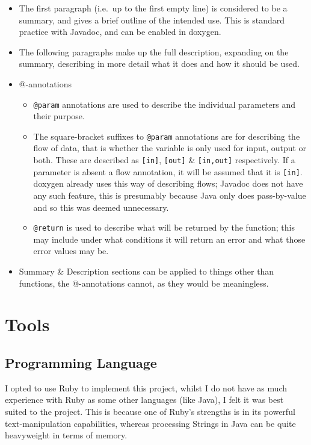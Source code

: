 \begin{itemize}
  \item The first paragraph (i.e.~up to the first empty line) is considered to
    be a summary, and gives a brief outline of the intended use. This is
    standard practice with Javadoc, and can be enabled in doxygen.
  \item The following paragraphs make up the full description, expanding on the
    summary, describing in more detail what it does and how it should be used.
  \item @-annotations
    \begin{itemize}
      \item \lstinline|@param| annotations are used to describe the individual
        parameters and their purpose.
      \item The square-bracket suffixes to \lstinline|@param| annotations are
        for describing the flow of data, that is whether the variable is only
        used for input, output or both. These are described as \lstinline|[in]|,
        \lstinline|[out]| \& \lstinline|[in,out]| respectively. If a parameter
        is absent a flow annotation, it will be assumed that it is
        \lstinline|[in]|.
        doxygen already uses this way of describing flows; Javadoc does not have
        any such feature, this is presumably because Java only does
        pass-by-value and so this was deemed unnecessary.
      \item \lstinline|@return| is used to describe what will be returned by the
        function; this may include under what conditions it will return an error
        and what those error values may be.
    \end{itemize}
    \item Summary \& Description sections can be applied to things other than
      functions, the @-annotations cannot, as they would be meaningless.
\end{itemize}

\section{Tools}
  \subsection{Programming Language}
    I opted to use Ruby to implement this project, whilst I do not have as much
    experience with Ruby as some other languages (like Java), I felt it was best
    suited to the project. This is because one of Ruby's strengths is in its
    powerful text-manipulation capabilities, whereas processing Strings in Java
    can be quite heavyweight in terms of memory.

